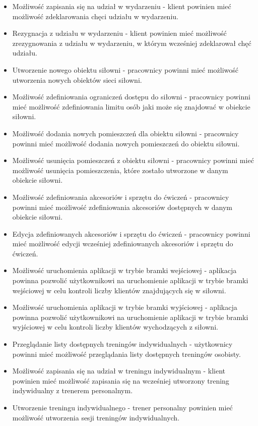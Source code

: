 \documentclass[a4paper,twoside,12pt]{book}
\begin{document}
\begin{itemize}
			\item Możliwość zapisania się na udział w wydarzeniu - klient powinien mieć możliwość zdeklarowania chęci udziału w wydarzeniu.
			\item Rezygnacja z udziału w wydarzeniu - klient powinien mieć możliwość zrezygnowania z udziału w wydarzeniu, w którym wcześniej zdeklarował chęć udziału.
			\item Utworzenie nowego obiektu siłowni - pracownicy powinni mieć możliwość utworzenia nowych obiektów sieci siłowni.
			\item Możliwość zdefiniowania ograniczeń dostępu do siłowni - pracownicy powinni mieć możliwość zdefiniowania limitu osób jaki może się znajdować w obiekcie siłowni.
			\item Możliwość dodania nowych pomieszczeń dla obiektu siłowni - pracownicy powinni mieć możliwość dodania nowych pomieszczeń do obiektu siłowni.
			\item Możliwość usunięcia pomieszczeń z obiektu siłowni - pracownicy powinni mieć możliwość usunięcia pomieszczenia, które zostało utworzone w danym obiekcie siłowni.
			\item Możliwość zdefiniowania akcesoriów i sprzętu do ćwiczeń - pracownicy powinni mieć możliwość zdefiniowania akcesoriów dostępnych w danym obiekcie siłowni.
			\item Edycja zdefiniowanych akcesoriów i sprzętu do ćwiczeń - pracownicy powinni mieć możliwość edycji wcześniej zdefiniowanych akcesoriów i sprzętu do ćwiczeń.
			\item Możliwość uruchomienia aplikacji w trybie bramki wejściowej - aplikacja powinna pozwolić użytkownikowi na uruchomienie aplikacji w trybie bramki wejściowej w celu kontroli liczby klientów znajdujących się w siłowni.
			\item Możliwość uruchomienia aplikacji w trybie bramki wyjściowej - aplikacja powinna pozwolić użytkownikowi na uruchomienie aplikacji w trybie bramki wyjściowej w celu kontroli liczby klientów wychodzących z siłowni.
			\item Przeglądanie listy dostępnych treningów indywidualnych - użytkownicy powinni mieć możliwość przeglądania listy dostępnych treningów osobisty.
			\item Możliwość zapisania się na udział w treningu indywidualnym - klient powinien mieć możliwość zapisania się na wcześniej utworzony trening indywidualny z trenerem personalnym.
			\item Utworzenie treningu indywidualnego - trener personalny powinien mieć możliwość utworzenia sesji treningów indywidualnych.

\end{itemize}
\end{document}
